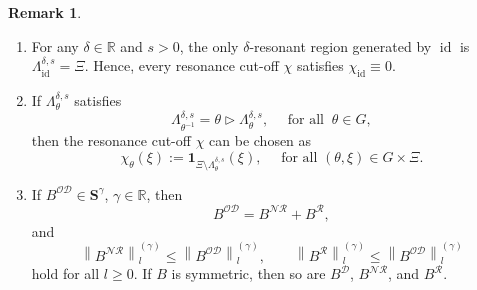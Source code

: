 \documentclass[10pt]{amsart}
\theoremstyle{definition}\newtheorem{defi}[theo]{Definition}\newtheorem{rema}[theo]{Remark}\newtheorem{exam}[theo]{Example}\newtheorem{nota}[theo]{Notation}
\DeclareMathOperator{\id}{id}
\newcommand{\R}{\mathbb R}
\newcommand{\CD}{\mathcal{D}}
\newcommand{\CN}{\mathcal{N}}
\newcommand{\CO}{\mathcal{O}}
\newcommand{\CR}{\mathcal{R}}
\newcommand{\CNR}{{\CN\!\CR}}
\newcommand{\bone}{\boldsymbol 1}
\newcommand{\BS}{\mathbf S}
\newcommand{\rco}{\chi}
\newcommand{\act}{\triangleright}
\newcommand{\snorm}[3]{\left\| #1\right\|_{#3}^{(#2)}}
\newcommand*{\romanenumi}{\renewcommand*{\theenumi}{\roman{enumi}}}
\begin{document}
\begin{rema}\label{rem:res}\leavevmode
\begin{enumerate}\romanenumi
\item For any $\delta\in\R$ and $s>0$, the only $\delta$-resonant region generated by $\id$ is $\Lambda_{\id}^{\delta,s}=\Xi$. Hence, every resonance cut-off $\rco$ satisfies $\rco_{\id}\equiv 0$.
\item \label{item:remrescutoff}
If $\Lambda_\theta^{\delta,s}$ satisfies
\begin{equation}
\Lambda_{\theta^{-1}}^{\delta,s}=\theta\act\Lambda_{\theta}^{\delta,s},\quad \text{ for all } \ \theta\in G,
\end{equation}
then the resonance cut-off $\rco$ can be chosen as
\begin{equation}\label{eq:rescutoffstandard}
\rco_\theta(\xi):=\bone_{\Xi\setminus\Lambda_{\theta}^{\delta,s}}(\xi), \quad \text{ for all } (\theta,\xi)\in G\times\Xi.
\end{equation}
\item \label{item:remres}
If $B^{\CO\CD}\in\BS^\gamma$, $\gamma\in\R$, then
\begin{equation}
B^{\CO\CD}=B^{\CNR}+B^{\CR},
\end{equation}
and
\begin{equation}\label{eq:estpartbyfull}
\snorm{B^{\CNR}}{\gamma}{l}\leq\snorm{B^{\CO\CD}}{\gamma}{l},\qquad
\snorm{B^{\CR}}{\gamma}{l}\leq\snorm{B^{\CO\CD}}{\gamma}{l}
\end{equation}
hold for all $l\geq 0$. If $B$ is symmetric, then so are $B^{\CD}$, $B^{\CNR}$, and $B^{\CR}$.
\end{enumerate}
\end{rema}
\end{document}
